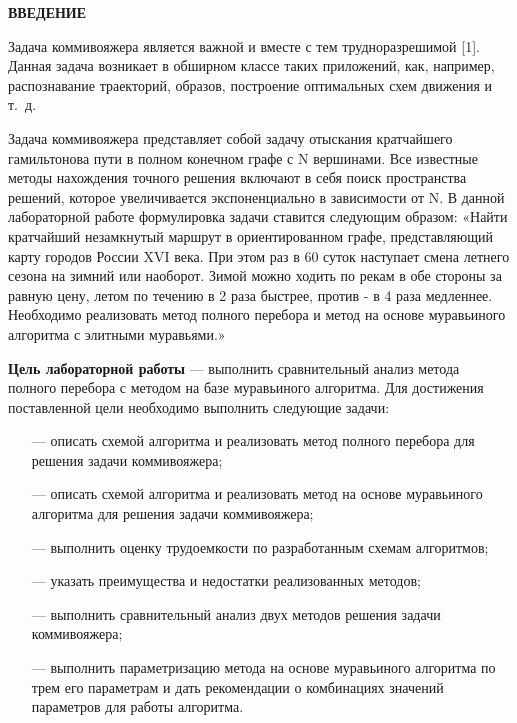 \begin{center}
    \textbf{ВВЕДЕНИЕ}
\end{center}

Задача коммивояжера является важной и вместе с тем трудноразрешимой [1]. Данная
задача возникает в обширном классе таких приложений, как, например, распознавание траекторий, образов, построение оптимальных схем движения и т.~д.

Задача коммивояжера представляет собой задачу отыскания кратчайшего гамильтонова
пути в полном конечном графе с N вершинами. Все известные методы нахождения точного решения включают в себя поиск пространства решений, которое увеличивается экспоненциально
в зависимости от N. В данной лабораторной работе формулировка задачи ставится следующим образом: «Найти кратчайший незамкнутый маршрут в ориентированном графе, представляющий карту городов России XVI века. При этом раз в 60 суток наступает смена летнего сезона на зимний или наоборот. Зимой можно ходить по рекам в обе стороны за равную цену, летом по течению в 2 раза быстрее, против - в 4 раза медленнее. Необходимо реализовать метод полного перебора и метод на основе муравьиного алгоритма с элитными муравьями.»

\textbf{Цель лабораторной работы} --- выполнить сравнительный анализ метода полного перебора с методом на базе муравьиного алгоритма. Для достижения поставленной цели необходимо выполнить следующие задачи:

\begin{itemize}
	\item[---] описать схемой алгоритма и реализовать метод полного перебора для решения задачи коммивояжера;
	\item[---] описать схемой алгоритма и реализовать метод на основе муравьиного алгоритма для решения задачи коммивояжера;
    \item[---] выполнить оценку трудоемкости по разработанным схемам алгоритмов;
    \item[---] указать преимущества и недостатки реализованных методов;
    \item[---] выполнить сравнительный анализ двух методов решения задачи коммивояжера;
    \item[---] выполнить параметризацию метода на основе муравьиного алгоритма по трем его параметрам и дать рекомендации о комбинациях значений параметров для работы алгоритма.
\end{itemize}